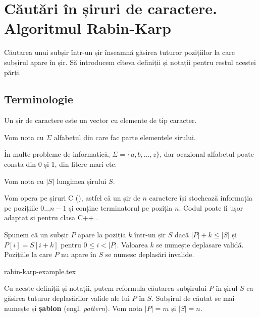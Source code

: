\documentclass[../main.tex]{subfiles}
\begin{document}
\chapter{Căutări în șiruri de caractere. Algoritmul Rabin-Karp}

Căutarea unui subșir într-un șir înseamnă găsirea tuturor pozițiilor la care subșirul apare în șir. Să introducem cîteva definiții și notații pentru restul acestei părți.


\section{Terminologie}
\label{sec:rabin-karp-terminology}

\begin{definition}
  Un șir de caractere este un vector cu elemente de tip caracter.
\end{definition}

\begin{notation}
  Vom nota cu $\Sigma$ alfabetul din care fac parte elementele șirului.
\end{notation}

În multe probleme de informatică, $\Sigma = \{ a, b, \dots, z\}$, dar ocazional alfabetul poate consta din 0 și 1, din litere mari etc.

\begin{notation}
  Vom nota cu $|S|$ lungimea șirului $S$.
\end{notation}

Vom opera pe șiruri C (), astfel că un șir de $n$ caractere își stochează informația pe pozițiile $0 \dots n-1$ și conține terminatorul  pe poziția $n$. Codul poate fi ușor adaptat
și pentru clasa C++ .

\begin{definition}
  Spunem că un subșir $P$ apare la poziția $k$ într-un șir $S$ dacă $|P| + k \leq |S|$ și $P[i] = S[i + k]$ pentru $0 \leq i < |P|$. Valoarea $k$ se numește deplasare validă. Pozițiile la care $P$ nu apare în $S$ se numesc deplasări invalide.
\end{definition}

{rabin-karp-example.tex}

Cu aceste definiții și notații, putem reformula căutarea subșirului $P$ în șirul $S$ ca găsirea tuturor deplasărilor valide ale lui $P$ în $S$. Subșirul de căutat se mai numește și \textbf{șablon} (engl. \textit{pattern}). Vom nota $|P| = m$ și $|S| = n$.
\end{document}
